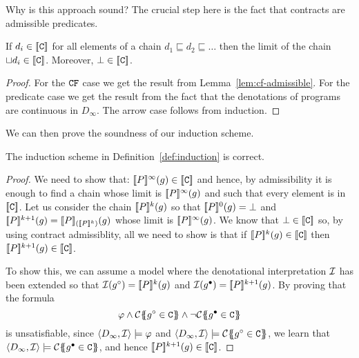 Why is this approach sound? The crucial step here is the fact that contracts are admissible predicates.
\begin{theorem}
If $d_i \in \dbrace{\Ct}$ for all elements of a chain $d_1 \sqsubseteq d_2 \sqsubseteq \ldots$ then the limit of the chain 
$\sqcup d_i \in \dbrace{\Ct}$. Moreover, $\bot \in \dbrace{\Ct}$.
\end{theorem}
\begin{proof}
For the $\CF$ case we get the result from Lemma~\ref{lem:cf-admissible}. 
For the predicate case we get the result from the fact that the denotations of programs 
are continuous in $D_{\infty}$. The arrow case follows from induction.
\end{proof}

We can then prove the soundness of our induction scheme.
\begin{theorem} The induction scheme in Definition~\ref{def:induction} is correct. \end{theorem}
\begin{proof} We need to show that: 
$\dbrace{P}^{\infty}(g) \in \dbrace{\Ct}$ and hence, by admissibility it is enough to find
a chain whose limit is $\dbrace{P}^{\infty}(g)$ and such that every element is in $\dbrace{\Ct}$.
Let us consider the chain $\dbrace{P}^{k}(g)$ so that $\dbrace{P}^0(g) = \bot$ and 
$\dbrace{P}^{k+1}(g) = \dbrace{P}_{(\dbrace{P}^{k})}(g)$ whose limit is $\dbrace{P}^{\infty}(g)$. We 
know that $\bot \in \dbrace{\Ct}$ so, by using contract admissiblity, all we need to show is
that if $\dbrace{P}^{k}(g) \in \dbrace{\Ct}$ then $\dbrace{P}^{k+1}(g) \in \dbrace{\Ct}$. 

To show this, we can assume a model where the denotational interpretation ${\cal I}$ has been 
extended so that ${\cal I}(g^{\circ}) = \dbrace{P}^{k}(g)$ and ${\cal I}(g^{\bullet}) = \dbrace{P}^{k+1}(g)$.
By proving that the formula 
\[ \phi \land \ctrans{}{}{g^{\circ} \in \Ct} \land \neg \ctrans{}{}{g^{\bullet} \in \Ct} \] 
is unsatisfiable, since $\langle D_{\infty},{\cal I}\rangle \models \phi$ and 
$\langle D_{\infty},{\cal I}\rangle \models \ctrans{}{}{g^{\circ} \in \Ct}$, we learn 
that $\langle D_{\infty},{\cal I}\rangle \models \ctrans{}{}{g^{\bullet} \in \Ct}$, 
and hence $\dbrace{P}^{k+1}(g) \in \dbrace{\Ct}$.
\end{proof} 

